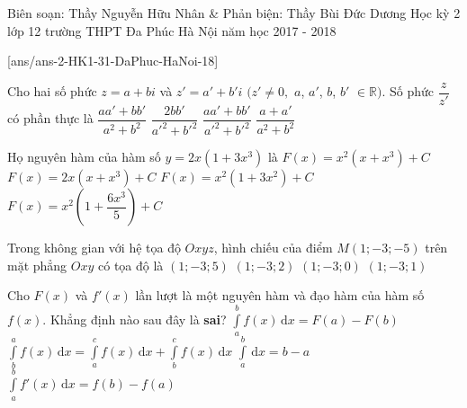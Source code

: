 \begin{name}
{Biên soạn: Thầy Nguyễn Hữu Nhân \& Phản biện: Thầy Bùi Đức Dương}
{Học kỳ 2 lớp 12 trường THPT Đa Phúc Hà Nội năm học 2017 - 2018}
\end{name}
\setcounter{ex}{0}\setcounter{bt}{0}
[ans/ans-2-HK1-31-DaPhuc-HaNoi-18]

\begin{ex}%
	Cho hai số phức $z=a+bi$ và $z'=a'+b'i$ $(z' \neq 0,$ $a$, $a'$, $b$, $b'$ $\in \mathbb{R})$. Số phức $\dfrac{z}{z'}$ có phần thực là
	\choice
	{$\dfrac{aa'+bb'}{a^2+b^2}$}
	{$\dfrac{2bb'}{{a'}^2+{b'}^2}$}
	{\True $\dfrac{aa'+bb'}{{a'}^2+{b'}^2}$} 
	{$\dfrac{a+a'}{a^2+b^2}$}
\end{ex}

\begin{ex}%
	Họ nguyên hàm của hàm số $y=2x(1+3x^3)$ là
	\choice
	{$F(x)=x^2(x+x^3)+C$}
	{$F(x)=2x(x+x^3)+C$}
	{$F(x)=x^2(1+3x^2)+C$}
	{\True $F(x)=x^2 \left( 1+\dfrac{6x^3}{5} \right) +C $}
\end{ex}

\begin{ex}%
	Trong không gian với hệ tọa độ $Oxyz$, hình chiếu của điểm $M(1;-3;-5)$ trên mặt phẳng $Oxy$ có tọa độ là
	\choice
	{$(1;-3;5)$}
	{$(1;-3;2)$}
	{\True $(1;-3;0)$}
	{$(1;-3;1)$}
\end{ex}

\begin{ex}%
	Cho $F(x)$ và $f'(x)$ lần lượt là một nguyên hàm và đạo hàm của hàm số $f(x)$. Khẳng định nào sau đây là \textbf{sai}?
	\choice
	{\True $\int\limits_a^b f(x)\mathrm{\,d}x= F(a)- F(b)$}
	{$\displaystyle \int\limits_b^a f(x) \mathrm{\,d}x = \displaystyle \int\limits_a^c f(x) \mathrm{\,d}x+ \displaystyle \int\limits_b^c f(x) \mathrm{\,d}x$}
	{$\displaystyle \int\limits_a^b \mathrm{\,d}x = b-a$}
	{$\displaystyle \int\limits_a^b f'(x) \mathrm{\,d}x = f(b)- f(a)$}
\end{ex}

